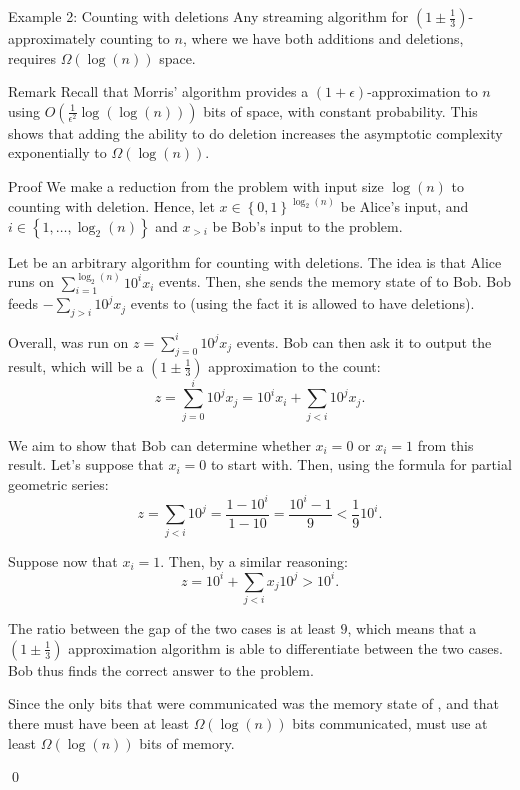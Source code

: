 \documentclass[a4paper]{article}
\begin{document}
\begin{parag}{Example 2: Counting with deletions}
    Any streaming algorithm for $\left(1 \pm \frac{1}{3}\right)$-approximately counting to $n$, where we have both additions and deletions, requires $\Omega\left(\log\left(n\right)\right)$ space.

    \begin{subparag}{Remark}
        Recall that Morris' algorithm provides a $\left(1+\epsilon\right)$-approximation to $n$ using $O\left(\frac{1}{\epsilon^2} \log\left(\log\left(n\right)\right)\right)$ bits of space, with constant probability. This shows that adding the ability to do deletion increases the asymptotic complexity exponentially to $\Omega\left(\log\left(n\right)\right)$.
    \end{subparag}

    \begin{subparag}{Proof}
        We make a reduction from the  problem with input size $\log\left(n\right)$ to counting with deletion. Hence, let $x \in \left\{0, 1\right\}^{\log_{2}\left(n\right)}$ be Alice's input, and $i \in \left\{1, \ldots, \log_{2}\left(n\right)\right\}$ and $x_{> i}$ be Bob's input to the  problem.

        Let  be an arbitrary algorithm for counting with deletions. The idea is that Alice runs  on $\sum_{i=1}^{\log_2\left(n\right)} 10^i x_i$ events. Then, she sends the memory state of  to Bob. Bob feeds $-\sum_{j > i} 10^j x_j$ events to  (using the fact it is allowed to have deletions).

        Overall,  was run on $z = \sum_{j=0}^{i} 10^j x_j$ events. Bob can then ask it to output the result, which will be a $\left(1 \pm \frac{1}{3}\right)$ approximation to the count: 
        \[z = \sum_{j=0}^{i} 10^j x_j = 10^i x_i + \sum_{j < i} 10^j x_j.\]
        
        We aim to show that Bob can determine whether $x_i = 0$ or $x_i = 1$ from this result. Let's suppose that $x_i = 0$ to start with. Then, using the formula for partial geometric series: 
        \[z = \sum_{j < i} 10^j = \frac{1 - 10^i}{1 - 10} = \frac{10^i - 1}{9} < \frac{1}{9} 10^{i}.\]
        
        Suppose now that $x_i = 1$. Then, by a similar reasoning: 
        \[z = 10^i + \sum_{j < i} x_j 10^j > 10^i.\]
        
        The ratio between the gap of the two cases is at least $9$, which means that a $\left(1 \pm \frac{1}{3}\right)$ approximation algorithm is able to differentiate between the two cases. Bob thus finds the correct answer to the  problem.

        Since the only bits that were communicated was the memory state of , and that there must have been at least $\Omega\left(\log\left(n\right)\right)$ bits communicated,  must use at least $\Omega\left(\log\left(n\right)\right)$ bits of memory.

        \qed
    \end{subparag}
\end{parag}
\end{document}
